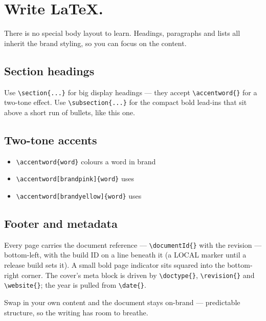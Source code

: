 \documentclass{prettydoc}
\begin{document}
\clearpage
{}

\section{Write  LaTeX.}

There is no special body layout to learn. Headings, paragraphs and lists all
inherit the brand styling, so you can focus on the content.

\subsection{Section headings}

Use \verb|\section{...}| for big display headings — they accept \verb|\accentword{}|
for a two-tone effect. Use \verb|\subsection{...}| for the compact bold lead-ins
that sit above a short run of bullets, like this one.

\subsection{Two-tone accents}

\begin{itemize}
  \item \verb|\accentword{word}| colours a word in brand 
  \item \verb|\accentword[brandpink]{word}| uses 
  \item \verb|\accentword[brandyellow]{word}| uses 
\end{itemize}

\subsection{Footer and metadata}

Every page carries the document reference — \verb|\documentId{}| with the
revision — bottom-left, with the build ID on a line beneath it (a LOCAL
marker until a release build sets it). A small bold 
page indicator sits squared into the bottom-right corner. The cover's meta
block is driven by \verb|\doctype{}|, \verb|\revision{}| and \verb|\website{}|;
the year is pulled from \verb|\date{}|.

\closing{Swap in your own content and the document stays on-brand —
predictable structure, so the writing has room to breathe.}
\end{document}
